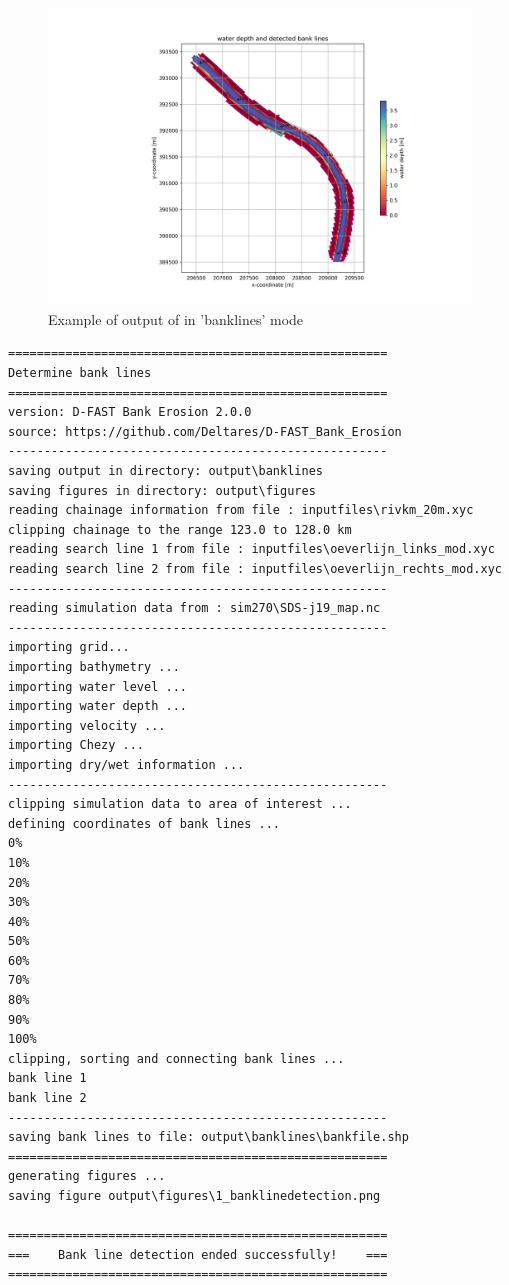 \begin{figure}
\includegraphics[width=\textwidth]{figures/1_banklinedetection.png}
\caption{Example of output of \dfastbe in 'banklines' mode}
\label{Fig2.2}
\end{figure}

\begin{Verbatim}
=====================================================
Determine bank lines
=====================================================
version: D-FAST Bank Erosion 2.0.0
source: https://github.com/Deltares/D-FAST_Bank_Erosion
-----------------------------------------------------
saving output in directory: output\banklines
saving figures in directory: output\figures
reading chainage information from file : inputfiles\rivkm_20m.xyc
clipping chainage to the range 123.0 to 128.0 km
reading search line 1 from file : inputfiles\oeverlijn_links_mod.xyc
reading search line 2 from file : inputfiles\oeverlijn_rechts_mod.xyc
-----------------------------------------------------
reading simulation data from : sim270\SDS-j19_map.nc
-----------------------------------------------------
importing grid...
importing bathymetry ...
importing water level ...
importing water depth ...
importing velocity ...
importing Chezy ...
importing dry/wet information ...
-----------------------------------------------------
clipping simulation data to area of interest ...
defining coordinates of bank lines ...
0%
10%
20%
30%
40%
50%
60%
70%
80%
90%
100%
clipping, sorting and connecting bank lines ...
bank line 1
bank line 2
-----------------------------------------------------
saving bank lines to file: output\banklines\bankfile.shp
=====================================================
generating figures ...
saving figure output\figures\1_banklinedetection.png

=====================================================
===    Bank line detection ended successfully!    ===
=====================================================
\end{Verbatim}

